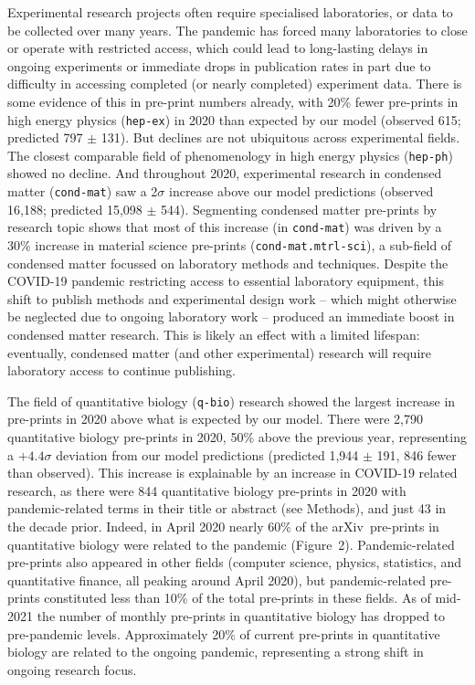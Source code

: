\documentclass[a4paper,12pt]{article}
\newcommand{\arxiv}{arXiv}
\begin{document}
Experimental research projects often require specialised laboratories, or data to be collected over many years. The pandemic has forced many laboratories to close or operate with restricted access\cite{PhysicsWorld,ScienceMag}, which could lead to long-lasting delays in ongoing experiments or immediate drops in publication rates in part due to difficulty in accessing completed (or nearly completed) experiment data. There is some evidence of this in pre-print numbers already, with {20\%} fewer pre-prints in high energy physics (\texttt{hep-ex}) in 2020 than expected by our model (observed 615; predicted 797 $\pm$ 131). But declines are not ubiquitous across experimental fields. The closest comparable field of phenomenology in high energy physics (\texttt{hep-ph}) showed no decline. And throughout 2020, experimental research in condensed matter (\texttt{cond-mat}) saw a 2$\sigma$ increase above our model predictions (observed 16,188; predicted 15,098 $\pm$ 544). Segmenting condensed matter pre-prints by research topic shows that most of this increase (in \texttt{cond-mat}) was driven by a 30\% increase in material science pre-prints (\texttt{cond-mat.mtrl-sci}), a sub-field of condensed matter focussed on laboratory methods and techniques. Despite the COVID-19 pandemic restricting access to essential laboratory equipment, this shift to publish methods and experimental design work -- which might otherwise be neglected due to ongoing laboratory work -- produced an immediate boost in condensed matter research. This is likely an effect with a limited lifespan: eventually, condensed matter (and other experimental) research will require laboratory access to continue publishing.

The field of quantitative biology (\texttt{q-bio}) research showed the largest increase in pre-prints in 2020 above what is expected by our model. There were {2,790} quantitative biology pre-prints in 2020, {50\%} above the previous year, representing a $+4.4\sigma$ deviation from our model predictions (predicted 1,944 $\pm$ 191, 846 fewer than observed). This increase is explainable by an increase in COVID-19 related research, as there were 844 quantitative biology pre-prints in 2020 with pandemic-related terms in their title or abstract (see Methods), and just 43 in the decade prior. Indeed, in {April 2020} nearly 60\% of the \arxiv\ pre-prints in quantitative biology were related to the pandemic (Figure~2). Pandemic-related pre-prints also appeared in other fields (computer science, physics, statistics, and quantitative finance, all peaking around {April 2020}), but pandemic-related pre-prints constituted less than 10\% of the total pre-prints in these fields. As of mid-2021 the number of monthly pre-prints in quantitative biology has dropped to pre-pandemic levels. Approximately 20\% of current pre-prints in quantitative biology are related to the ongoing pandemic, representing a strong shift in ongoing research focus.
 
\end{document}
